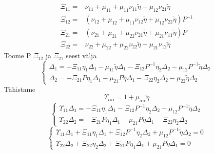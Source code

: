 \documentclass[class=article, crop=false]{standalone}
\begin{document}
\begin{equation}\label{XiTähistus}
	\begin{split}
		\Xi_{11} = & \nu_{11} + \mu_{11} + \mu_{11} \nu_{11} \tilde{ \eta} + \mu_{12} \nu_{21} \tilde{ \eta} \\
		\Xi_{12} = & (\nu_{12} + \mu_{12} + \mu_{11} \nu_{12} \tilde{ \eta} + \mu_{12} \nu_{22} \tilde{ \eta}) P^{-1} \\
		\Xi_{21} = & (\nu_{21} + \mu_{21} + \mu_{22} \nu_{21} \tilde{ \eta} + \mu_{21} \nu_{11} \tilde{ \eta}) P \\
		\Xi_{22} = & \nu_{22} + \mu_{22} + \mu_{22} \nu_{22} \tilde{ \eta} + \mu_{21} \nu_{12} \tilde{ \eta}
	\end{split}
\end{equation}
Toome P $ \Xi_{12} $ ja $ \Xi_{21} $ seest välja
\begin{equation}\label{key}
	\begin{cases}
		\Delta_{1} = - \Xi_{11} \eta_{ 1} \Delta_{1} - \mu_{11} \tilde{ \eta} \Delta_{1} - \Xi_{12} P^{-1} \eta_{ 2} \Delta_{2} - \mu_{12} P^{ -1} \tilde{ \eta} \Delta_{2} \\
		\Delta_{2} = - \Xi_{21} P \eta_{ 1} \Delta_{1} - \mu_{21} P \tilde{ \eta} \Delta_{1} - \Xi_{22} \eta_{ 2} \Delta_{2} - \mu_{22} \tilde{ \eta} \Delta_{2}
	\end{cases}
\end{equation}
Tähistame
\begin{equation}\label{ÜpsilonTähistus}
	\Upsilon_{ \alpha \alpha} = 1 + \mu_{ \alpha \alpha} \tilde{ \eta}
\end{equation}
\begin{equation}\label{key}
	\begin{cases}
		\Upsilon_{11} \Delta_{1} = - \Xi_{11} \eta_{ 1} \Delta_{1} - \Xi_{12} P^{-1} \eta_{ 2} \Delta_{2} - \mu_{12} P^{ -1} \tilde{ \eta} \Delta_{2} \\
		\Upsilon_{22} \Delta_{2} = - \Xi_{21} P \eta_{ 1} \Delta_{1} - \mu_{21} P \tilde{ \eta} \Delta_{1} - \Xi_{22} \eta_{ 2} \Delta_{2}
	\end{cases}
\end{equation}
\begin{equation}\label{key}
	\begin{cases}
		\Upsilon_{11} \Delta_{1} + \Xi_{11} \eta_{ 1} \Delta_{1} + \Xi_{12} P^{-1} \eta_{ 2} \Delta_{2} + \mu_{12} P^{ -1} \tilde{ \eta} \Delta_{2} = 0 \\
		\Upsilon_{22} \Delta_{2} + \Xi_{22} \eta_{ 2} \Delta_{2} + \Xi_{21} P \eta_{ 1} \Delta_{1} + \mu_{21} P \tilde{ \eta} \Delta_{1} = 0
	\end{cases}
\end{equation}
\end{document}
